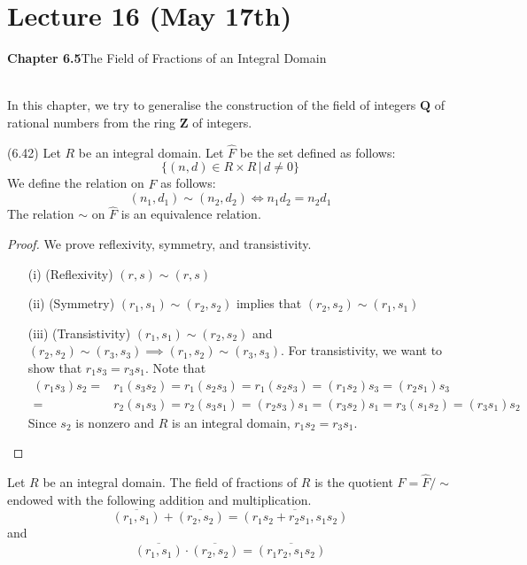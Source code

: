 \section{Lecture 16 (May 17th)}
{\bf Chapter 6.5}\hspace{2ex}The Field of Fractions of an Integral Domain
\\\\
\begin{rmk}
In this chapter, we try to generalise the construction of the field of integers ${\bm Q}$ of rational numbers from the ring ${\bm Z}$ of integers.
\end{rmk}
\vspace{2ex}
\begin{lem}
(6.42) Let $R$ be an integral domain. Let $\hat{F}$ be the set defined as follows: 
\[\{(n,d)\in R\times R\,|\,d\ne 0\}\]
We define the relation on $\hat{F}$ as follows:
\[(n_1,d_1)\sim (n_2,d_2)\iff n_1d_2=n_2d_1\]
The relation $\sim $ on $\hat{F}$ is an equivalence relation. 
\end{lem}
\vspace{2ex}
\begin{proof}
We prove reflexivity, symmetry, and transistivity.
\begin{itemize}
\item[(i)] (Reflexivity) $(r,s)\sim (r,s)$
\item[(ii)] (Symmetry) $(r_1,s_1)\sim (r_2,s_2)$ implies that $(r_2,s_2)\sim (r_1,s_1)$
\item[(iii)] (Transistivity) $(r_1,s_1)\sim (r_2,s_2)$ and $(r_2,s_2)\sim (r_3,s_3)\implies (r_1,s_2)\sim (r_3,s_3)$. For transistivity, we want to show that $r_1s_3=r_3s_1$. Note that
\begin{align*}
(r_1s_3)s_2=&r_1(s_3s_2)=r_1(s_2s_3)=r_1(s_2s_3)=(r_1s_2)s_3=(r_2s_1)s_3\\=&r_2(s_1s_3)=r_2(s_3s_1)=(r_2s_3)s_1=(r_3s_2)s_1=r_3(s_1s_2)=(r_3s_1)s_2
\end{align*}
Since $s_2$ is nonzero and $R$ is an integral domain, $r_1s_2=r_3s_1$.
\end{itemize}
\end{proof}
\vspace{2ex}
\begin{defi}
Let $R$ be an integral domain. The field of fractions of $R$ is the quotient $F=\hat{F}/\sim$ endowed with the following addition and multiplication. 
\[\overline{(r_1,s_1)}+\overline{(r_2,s_2)}=\overline{(r_1s_2+r_2s_1,s_1s_2)}\]
and
\[\overline{(r_1,s_1)}\cdot \overline{(r_2,s_2)}=\overline{(r_1r_2,s_1s_2)}\]
\end{defi}
